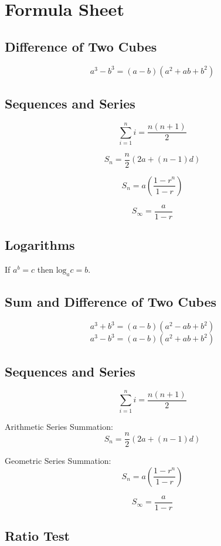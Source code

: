 \documentclass[11pt]{article} %
\begin{document}

\newpage


\LARGE
\section*{Formula Sheet}

\subsection*{Difference of Two Cubes}
\[ a^3 - b^3 = (a-b)(a^2 + ab + b^2)\]
\subsection*{Sequences and Series}
\[ \sum_{i=1}^{n} i = \frac{n(n+1)}{2}\]

\[ S_n = \frac{n}{2} \left(2a + (n-1) d \right)\]

\[ S_n = a\left(\frac{1-r^n}{1-r}\right)\]

\[ S_\infty = \frac{a}{1-r}\]
	\subsection*{Logarithms}
	If $a^b = c$ then $\mbox{log}_a c = b$.
	\subsection*{Sum and Difference of Two Cubes}
	\[ a^3 + b^3 = (a-b)(a^2 - ab + b^2)\]
	\[ a^3 - b^3 = (a-b)(a^2 + ab + b^2)\]
	
	
	\subsection*{Sequences and Series}
	
	\[ \sum_{i=1}^{n} i = \frac{n(n+1)}{2}\]
	
	Arithmetic Series Summation:
	\[ S_n = \frac{n}{2} \left(2a + (n-1) d \right)\]
	
	Geometric Series Summation:
	\[ S_n = a\left(\frac{1-r^n}{1-r}\right)\]
	
	\[ S_\infty = \frac{a}{1-r}\]

	\subsection*{Ratio Test}
	
\end{document}
